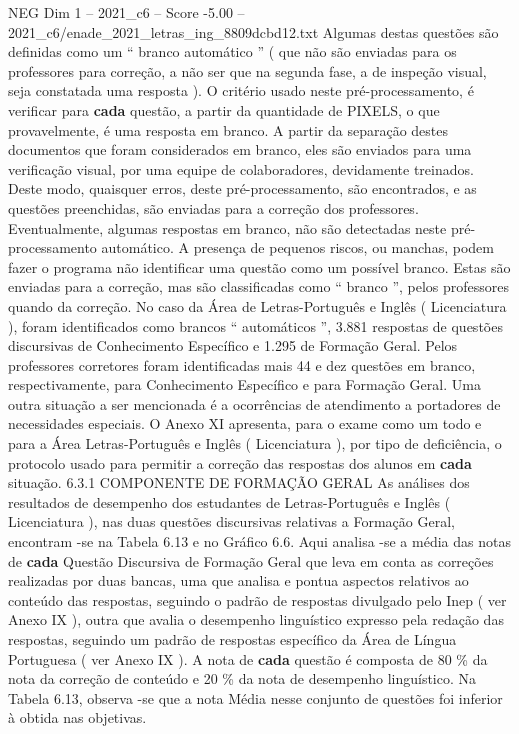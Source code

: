 \begin{textsample}{NEG Dim 1 – 2021\_c6 – Score -5.00 – 2021\_c6/enade\_2021\_letras\_ing\_8809dcbd12.txt}
Algumas destas questões são definidas como um “ branco automático ” ( que não são enviadas para os professores para correção, a não ser que na segunda fase, a de inspeção visual, seja constatada uma resposta ).
O critério usado neste pré-processamento, é verificar para \textbf{cada} questão, a partir da quantidade de PIXELS, o que provavelmente, é uma resposta em branco.
A partir da separação destes documentos que foram considerados em branco, eles são enviados para uma verificação visual, por uma equipe de colaboradores, devidamente treinados.
Deste modo, quaisquer erros, deste pré-processamento, são encontrados, e as questões preenchidas, são enviadas para a correção dos professores.
Eventualmente, algumas respostas em branco, não são detectadas neste pré-processamento automático.
A presença de pequenos riscos, ou manchas, podem fazer o programa não identificar uma questão como um possível branco.
Estas são enviadas para a correção, mas são classificadas como “ branco ”, pelos professores quando da correção.
No caso da Área de Letras-Português e Inglês ( Licenciatura ), foram identificados como brancos “ automáticos ”, 3.881 respostas de questões discursivas de Conhecimento Específico e 1.295 de Formação Geral.
Pelos professores corretores foram identificadas mais 44 e dez questões em branco, respectivamente, para Conhecimento Específico e para Formação Geral.
Uma outra situação a ser mencionada é a ocorrências de atendimento a portadores de necessidades especiais.
O Anexo XI apresenta, para o exame como um todo e para a Área Letras-Português e Inglês ( Licenciatura ), por tipo de deficiência, o protocolo usado para permitir a correção das respostas dos alunos em \textbf{cada} situação. 6.3.1 COMPONENTE DE FORMAÇÃO GERAL As análises dos resultados de desempenho dos estudantes de Letras-Português e Inglês ( Licenciatura ), nas duas questões discursivas relativas a Formação Geral, encontram -se na Tabela 6.13 e no Gráfico 6.6.
Aqui analisa -se a média das notas de \textbf{cada} Questão Discursiva de Formação Geral que leva em conta as correções realizadas por duas bancas, uma que analisa e pontua aspectos relativos ao conteúdo das respostas, seguindo o padrão de respostas divulgado pelo Inep ( ver Anexo IX ), outra que avalia o desempenho linguístico expresso pela redação das respostas, seguindo um padrão de respostas específico da Área de Língua Portuguesa ( ver Anexo IX ).
A nota de \textbf{cada} questão é composta de 80 \% da nota da correção de conteúdo e 20 \% da nota de desempenho linguístico.
Na Tabela 6.13, observa -se que a nota Média nesse conjunto de questões foi inferior à obtida nas objetivas.

\end{textsample}
